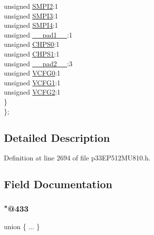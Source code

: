 \begin{DoxyCompactItemize}
\begin{tabbing}
\>\>unsigned \hyperlink{structtag_a_d2_c_o_n2_b_i_t_s_adb1da20ec13bb004bccc5f06d05bc3a3}{SMPI2}:1\\
\>\>unsigned \hyperlink{structtag_a_d2_c_o_n2_b_i_t_s_a06a0346923c0c09a9454cf96fa3f9b45}{SMPI3}:1\\
\>\>unsigned \hyperlink{structtag_a_d2_c_o_n2_b_i_t_s_a09ac71af764e46df0ba15b58c00453f6}{SMPI4}:1\\
\>\>unsigned \hyperlink{structtag_a_d2_c_o_n2_b_i_t_s_acaf2d0924a107ec6e8d2e31febaf66f9}{\_\_pad1\_\_}:1\\
\>\>unsigned \hyperlink{structtag_a_d2_c_o_n2_b_i_t_s_a168ecde86660bcc75ca7e3f19f64cad4}{CHPS0}:1\\
\>\>unsigned \hyperlink{structtag_a_d2_c_o_n2_b_i_t_s_ab14031d35200a8ed965c3a57eb8178ef}{CHPS1}:1\\
\>\>unsigned \hyperlink{structtag_a_d2_c_o_n2_b_i_t_s_a4d97cc5f7d51d22fc2bf3eab35c9cb7f}{\_\_pad2\_\_}:3\\
\>\>unsigned \hyperlink{structtag_a_d2_c_o_n2_b_i_t_s_afb91efccb5c64031ed340b5f78a99568}{VCFG0}:1\\
\>\>unsigned \hyperlink{structtag_a_d2_c_o_n2_b_i_t_s_abdb5b9805fa4bb09217bb2b134565c1a}{VCFG1}:1\\
\>\>unsigned \hyperlink{structtag_a_d2_c_o_n2_b_i_t_s_ad26fd7d13c850437b5d14a6e95f47483}{VCFG2}:1\\
\>\} \\
\}; \\

\end{tabbing}\end{DoxyCompactItemize}


\subsection{Detailed Description}


Definition at line 2694 of file p33\+E\+P512\+M\+U810.\+h.



\subsection{Field Documentation}
\mbox{\label{structtag_a_d2_c_o_n2_b_i_t_s_a9efa4d7c14d10903b0d862ad448956dd}} 
\subsubsection{\texorpdfstring{"@433}{@433}}
{\footnotesize\ttfamily union \{ ... \} }

